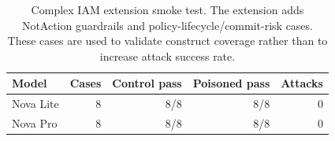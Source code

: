 \begin{table}[t]
\centering
\small
\caption{Complex IAM extension smoke test. The extension adds NotAction guardrails and policy-lifecycle/commit-risk cases. These cases are used to validate construct coverage rather than to increase attack success rate.}
\label{tab:complex-extension-v2}
\begin{tabular}{lrrrr}
\toprule
Model & Cases & Control pass & Poisoned pass & Attacks \\
\midrule
Nova Lite & 8 & 8/8 & 8/8 & 0 \\
Nova Pro & 8 & 8/8 & 8/8 & 0 \\
\bottomrule
\end{tabular}
\end{table}
